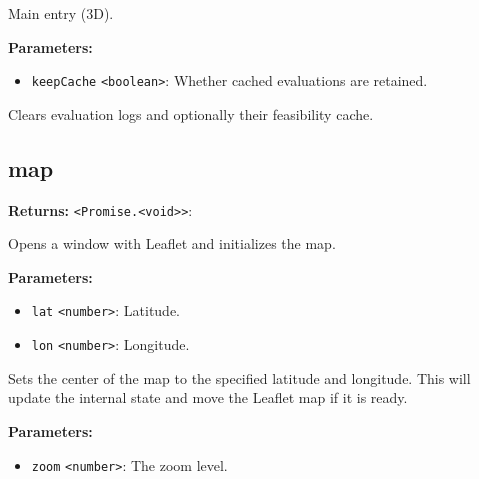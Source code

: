 \documentclass[12pt,a4paper]{article}
\begin{document}
\noindent Main entry (3D).

\vspace{5mm}
\noindent {}


\noindent \textbf{Parameters:}
\begin{itemize}
  \item \texttt{keepCache} \texttt{<boolean>}: Whether cached evaluations are retained.
\end{itemize}

\noindent Clears evaluation logs and optionally their feasibility cache.


\subsection{map}
\vspace{5mm}
\noindent {}


\noindent \textbf{Returns:} \texttt{<Promise.<void>>}:

\noindent Opens a window with Leaflet and initializes the map.

\vspace{5mm}
\noindent {}


\noindent \textbf{Parameters:}
\begin{itemize}
  \item \texttt{lat} \texttt{<number>}: Latitude.
  \item \texttt{lon} \texttt{<number>}: Longitude.
\end{itemize}

\noindent Sets the center of the map to the specified latitude and longitude.
This will update the internal state and move the Leaflet map if it is ready.

\vspace{5mm}
\noindent {}


\noindent \textbf{Parameters:}
\begin{itemize}
  \item \texttt{zoom} \texttt{<number>}: The zoom level.
\end{itemize}
\end{document}
